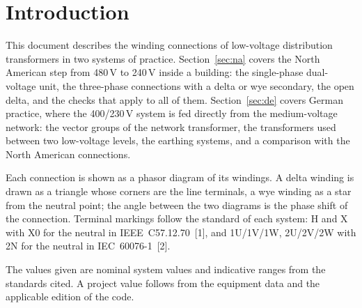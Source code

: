\section{Introduction}
\label{sec:introduction}

This document describes the winding connections of low-voltage distribution
transformers in two systems of practice. Section~\ref{sec:na} covers the
North American step from 480\,V to 240\,V inside a building: the single-phase
dual-voltage unit, the three-phase connections with a delta or wye secondary,
the open delta, and the checks that apply to all of them.
Section~\ref{sec:de} covers German practice, where the 400/230\,V system is
fed directly from the medium-voltage network: the vector groups of the
network transformer, the transformers used between two low-voltage levels,
the earthing systems, and a comparison with the North American connections.

Each connection is shown as a phasor diagram of its windings. A delta winding
is drawn as a triangle whose corners are the line terminals, a wye winding as
a star from the neutral point; the angle between the two diagrams is the
phase shift of the connection. Terminal markings follow the standard of each
system: H and X with X0 for the neutral in IEEE~C57.12.70~[1], and 1U/1V/1W,
2U/2V/2W with 2N for the neutral in IEC~60076-1~[2].

The values given are nominal system values and indicative ranges from the
standards cited. A project value follows from the equipment data and the
applicable edition of the code.
